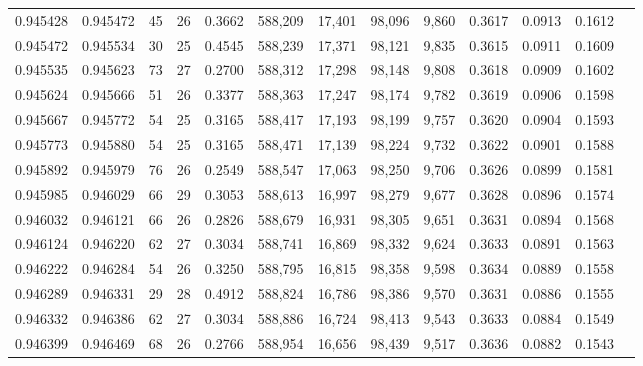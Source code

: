 \begin{tabular}{rrrrrrrrrrrrr}
0.945428 & 0.945472 &    45 &  26 &                                     0.3662 & 588,209 &  17,401 &  98,096 &   9,860 & 0.3617 & 0.0913 & 0.1612 \\
0.945472 & 0.945534 &    30 &  25 &                                     0.4545 & 588,239 &  17,371 &  98,121 &   9,835 & 0.3615 & 0.0911 & 0.1609 \\
0.945535 & 0.945623 &    73 &  27 &                                     0.2700 & 588,312 &  17,298 &  98,148 &   9,808 & 0.3618 & 0.0909 & 0.1602 \\
0.945624 & 0.945666 &    51 &  26 &                                     0.3377 & 588,363 &  17,247 &  98,174 &   9,782 & 0.3619 & 0.0906 & 0.1598 \\
0.945667 & 0.945772 &    54 &  25 &                                     0.3165 & 588,417 &  17,193 &  98,199 &   9,757 & 0.3620 & 0.0904 & 0.1593 \\
0.945773 & 0.945880 &    54 &  25 &                                     0.3165 & 588,471 &  17,139 &  98,224 &   9,732 & 0.3622 & 0.0901 & 0.1588 \\
0.945892 & 0.945979 &    76 &  26 &                                     0.2549 & 588,547 &  17,063 &  98,250 &   9,706 & 0.3626 & 0.0899 & 0.1581 \\
0.945985 & 0.946029 &    66 &  29 &                                     0.3053 & 588,613 &  16,997 &  98,279 &   9,677 & 0.3628 & 0.0896 & 0.1574 \\
0.946032 & 0.946121 &    66 &  26 &                                     0.2826 & 588,679 &  16,931 &  98,305 &   9,651 & 0.3631 & 0.0894 & 0.1568 \\
0.946124 & 0.946220 &    62 &  27 &                                     0.3034 & 588,741 &  16,869 &  98,332 &   9,624 & 0.3633 & 0.0891 & 0.1563 \\
0.946222 & 0.946284 &    54 &  26 &                                     0.3250 & 588,795 &  16,815 &  98,358 &   9,598 & 0.3634 & 0.0889 & 0.1558 \\
0.946289 & 0.946331 &    29 &  28 &                                     0.4912 & 588,824 &  16,786 &  98,386 &   9,570 & 0.3631 & 0.0886 & 0.1555 \\
0.946332 & 0.946386 &    62 &  27 &                                     0.3034 & 588,886 &  16,724 &  98,413 &   9,543 & 0.3633 & 0.0884 & 0.1549 \\
0.946399 & 0.946469 &    68 &  26 &                                     0.2766 & 588,954 &  16,656 &  98,439 &   9,517 & 0.3636 & 0.0882 & 0.1543 \\

\end{tabular}
